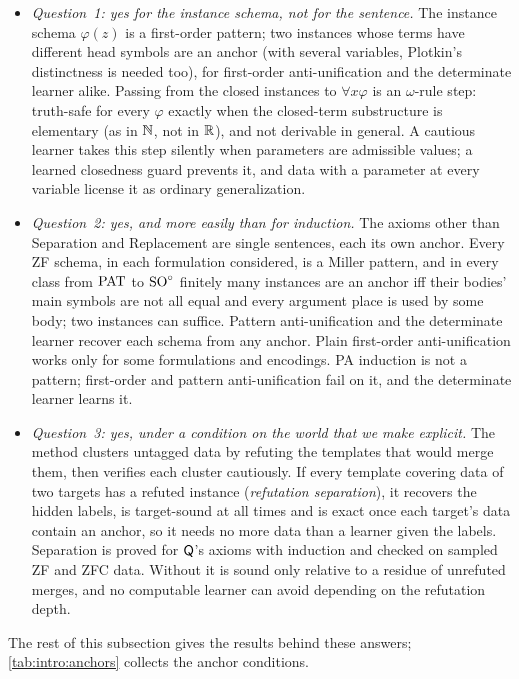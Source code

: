 \begin{itemize}[leftmargin=1.5em]
\item \emph{Question~1: yes for the instance schema, not for the sentence.} The instance schema $\varphi(z)$ is a
  first-order pattern; two instances whose terms have different head symbols are an anchor (with several variables,
  Plotkin's distinctness is needed too), for first-order anti-unification and the determinate learner alike. Passing
  from the closed instances to $\forall x\varphi$ is an $\omega$-rule step: truth-safe for every $\varphi$ exactly when
  the closed-term substructure is elementary (as in $\mathbb{N}$, not in $\mathbb{R}$), and not derivable in general. A cautious learner
  takes this step silently when parameters are admissible values; a learned closedness guard prevents it, and data with
  a parameter at every variable license it as ordinary generalization.
\item \emph{Question~2: yes, and more easily than for induction.} The axioms other than Separation and Replacement are
  single sentences, each its own anchor. Every ZF schema, in each formulation considered, is a Miller pattern, and in
  every class from $\mathrm{PAT}$ to $\mathrm{SO}^{\circ}$ finitely many instances are an anchor iff their bodies' main symbols are not all
  equal and every argument place is used by some body; two instances can suffice. Pattern anti-unification and the
  determinate learner recover each schema from any anchor. Plain first-order anti-unification works only for some
  formulations and encodings. PA induction is not a pattern; first-order and pattern anti-unification fail on it, and
  the determinate learner learns it.
\item \emph{Question~3: yes, under a condition on the world that we make explicit.} The method \DTRC{} clusters untagged
  data by refuting the templates that would merge them, then verifies each cluster cautiously. If every template
  covering data of two targets has a refuted instance (\emph{refutation separation}), it recovers the hidden labels, is
  target-sound at all times and is exact once each target's data contain an anchor, so it needs no more data than a
  learner given the labels. Separation is proved for $\mathsf{Q}$'s axioms with induction and checked on sampled ZF and ZFC
  data. Without it \DTRC{} is sound only relative to a residue of unrefuted merges, and no computable learner can avoid
  depending on the refutation depth.
\end{itemize}
The rest of this subsection gives the results behind these answers; \cref{tab:intro:anchors} collects the anchor
conditions.

